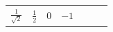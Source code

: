 {\begin{tabular}[t]{|l|l|l|l|l|l|l|}
                  $\frac{1}{\sqrt{2}}$
                 &
                  $\frac{1}{2}$
                 &
        0 &
                  $-1$
     \tabularnewline\cline{1-1}\cline{2-2}\cline{3-3}\cline{4-4}\cline{5-5}\cline{6-6}\cline{7-7}
    \end{tabular}} %
